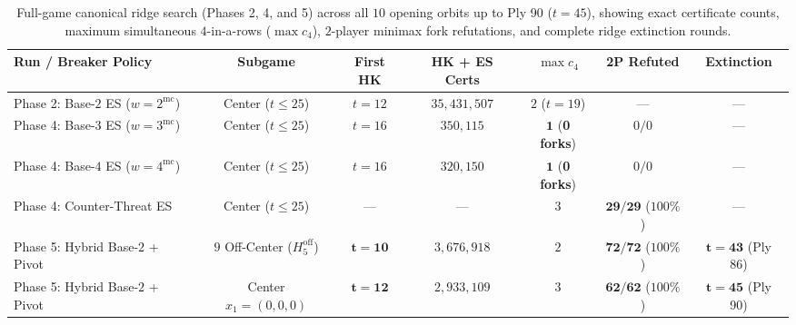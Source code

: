 \documentclass[11pt,a4paper]{article}
\theoremstyle{definition}
\theoremstyle{remark}
\begin{document}
\begin{table}[ht!]
\centering
\caption{Full-game canonical ridge search (Phases 2, 4, and 5) across all $10$ opening orbits up to Ply 90 ($t=45$), showing exact certificate counts, maximum simultaneous $4$-in-a-rows ($\max c_4$), $2$-player minimax fork refutations, and complete ridge extinction rounds.}
\label{tab:ridge_extinction}
\begin{tabular}{lcccccc}
\toprule
\textbf{Run / Breaker Policy} & \textbf{Subgame} & \textbf{First HK} & \textbf{HK + ES Certs} & $\max c_4$ & \textbf{2P Refuted} & \textbf{Extinction} \\
\midrule
Phase 2: Base-$2$ ES ($w=2^{\mathrm{mc}}$) & Center ($t \le 25$) & $t=12$ & $35,431,507$ & $2$ ($t=19$) & --- & --- \\
Phase 4: Base-$3$ ES ($w=3^{\mathrm{mc}}$) & Center ($t \le 25$) & $t=16$ & $350,115$    & $\mathbf{1}$ (\textbf{0 forks}) & $0 / 0$ & --- \\
Phase 4: Base-$4$ ES ($w=4^{\mathrm{mc}}$) & Center ($t \le 25$) & $t=16$ & $320,150$    & $\mathbf{1}$ (\textbf{0 forks}) & $0 / 0$ & --- \\
Phase 4: Counter-Threat ES                 & Center ($t \le 25$) & ---    & ---          & $3$ & $\mathbf{29 / 29}$ ($100\%$) & --- \\
Phase 5: Hybrid Base-$2$ + Pivot           & $9$ Off-Center ($H_5^{\mathrm{off}}$) & $\mathbf{t=10}$ & $3,676,918$ & $2$ & $\mathbf{72 / 72}$ ($100\%$) & $\mathbf{t=43}$ (Ply 86) \\
Phase 5: Hybrid Base-$2$ + Pivot           & Center $x_1=(0,0,0)$                  & $\mathbf{t=12}$ & $2,933,109$ & $3$ & $\mathbf{62 / 62}$ ($100\%$) & $\mathbf{t=45}$ (Ply 90) \\
\bottomrule
\end{tabular}
\end{table}
\end{document}
